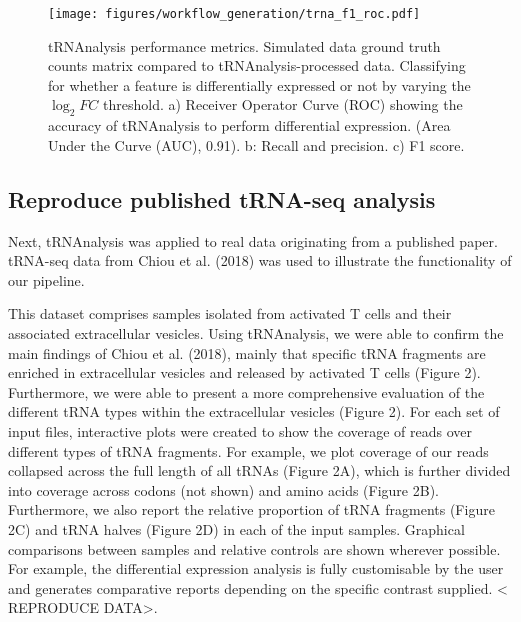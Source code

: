 \begin{figure}[htb]
\centering
\texttt{[image: figures/workflow\_generation/trna\_f1\_roc.pdf]}
\caption[tRNAnalysis performance metrics]{tRNAnalysis performance metrics.
Simulated data ground truth counts matrix compared to tRNAnalysis-processed data.
Classifying for whether a feature is differentially expressed or not by varying the $\log_{2}FC$ threshold.
a) Receiver Operator Curve (ROC) showing the accuracy of tRNAnalysis to perform differential expression. (Area Under the Curve (AUC), 0.91).
b: Recall and precision.
c) F1 score.}
\label{fig:trna_f1_roc}
\end{figure}

\subsection{Reproduce published tRNA-seq analysis}
Next, tRNAnalysis was applied to real data originating from a published paper.
tRNA-seq data from Chiou et al. (2018) was used to illustrate the functionality of our pipeline\cite{chiou2018selective}.

This dataset comprises samples isolated from activated T cells and their associated extracellular vesicles.
Using tRNAnalysis, we were able to confirm the main findings of Chiou et al. (2018), mainly that specific tRNA fragments are enriched in extracellular vesicles and released by activated T cells (Figure 2).
Furthermore, we were able to present a more comprehensive evaluation of the different tRNA types within the extracellular vesicles (Figure 2).
For each set of input files, interactive plots were created to show the coverage of reads over different types of tRNA fragments.
For example, we plot coverage of our reads collapsed across the full length of all tRNAs (Figure 2A), which is further divided into coverage across codons (not shown) and amino acids (Figure 2B).
Furthermore, we also report the relative proportion of tRNA fragments (Figure 2C) and tRNA halves (Figure 2D) in each of the input samples.
Graphical comparisons between samples and relative controls are shown wherever possible.
For example, the differential expression analysis is fully customisable by the user and generates comparative reports depending on the specific contrast supplied.
< REPRODUCE DATA>.